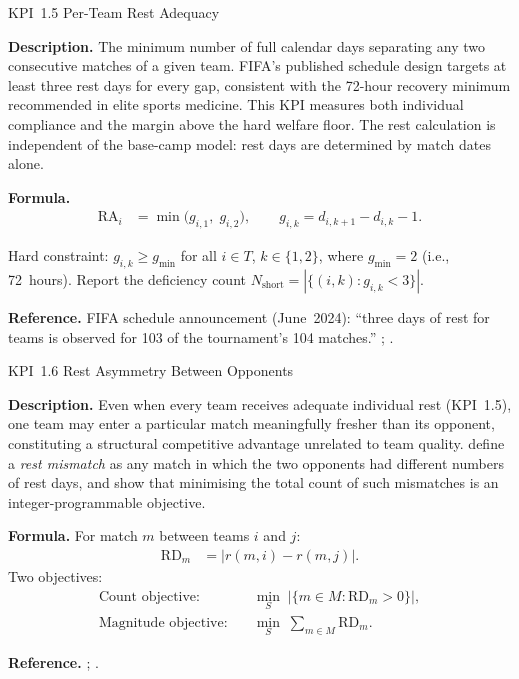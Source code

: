 \documentclass[12pt, letterpaper]{article}
\newcommand{\kpilabel}[1]{\noindent\textbf{#1}\enspace}
\begin{document}
\begin{kpibox}{KPI~1.5 \textendash{} Per-Team Rest Adequacy}

\kpilabel{Description.}
The minimum number of full calendar days separating any two consecutive
matches of a given team.  FIFA's published schedule design targets at
least three rest days for every gap, consistent with the 72-hour
recovery minimum recommended in elite sports medicine.  This KPI
measures both individual compliance and the margin above the hard
welfare floor.  The rest calculation is independent of the base-camp
model: rest days are determined by match dates alone.

\medskip
\kpilabel{Formula.}
\begin{align*}
  \mathrm{RA}_i &= \min\!\bigl(g_{i,1},\; g_{i,2}\bigr),
  \qquad g_{i,k} = d_{i,k+1} - d_{i,k} - 1.
\end{align*}
\vspace{-8pt}

\noindent
Hard constraint: $g_{i,k} \geq g_{\min}$ for all $i \in T$,
$k \in \{1,2\}$, where $g_{\min} = 2$ (i.e., 72~hours).
Report the deficiency count $N_{\mathrm{short}} =
|\{(i,k) : g_{i,k} < 3\}|$.

\medskip
\kpilabel{Reference.}
FIFA schedule announcement (June~2024): ``three days of rest for
teams is observed for 103 of the tournament's 104 matches.''
\citet{AtanCavdaroglu2018}; \citet{KendallEtAl2010}.
\end{kpibox}

\begin{kpibox}{KPI~1.6 \textendash{} Rest Asymmetry Between Opponents}

\kpilabel{Description.}
Even when every team receives adequate individual rest (KPI~1.5), one
team may enter a particular match meaningfully fresher than its opponent,
constituting a structural competitive advantage unrelated to team quality.
\citet{AtanCavdaroglu2018} define a \emph{rest mismatch} as any match in
which the two opponents had different numbers of rest days, and show that
minimising the total count of such mismatches is an integer-programmable
objective.

\medskip
\kpilabel{Formula.}
For match $m$ between teams $i$ and $j$:
\begin{align*}
  \mathrm{RD}_m &= \bigl|r(m,i) - r(m,j)\bigr|.
\end{align*}
Two objectives:
\begin{align*}
  \text{Count objective:}\quad
    &\min_{S}\;\bigl|\{m \in M : \mathrm{RD}_m > 0\}\bigr|,
  \\[4pt]
  \text{Magnitude objective:}\quad
    &\min_{S}\;\sum_{m \in M} \mathrm{RD}_m.
\end{align*}

\medskip
\kpilabel{Reference.}
\citet{AtanCavdaroglu2018}; \citet{CavdarogluAtan2022}.
\end{kpibox}
\end{document}
